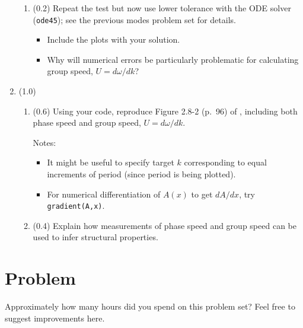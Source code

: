 \documentclass[11pt,titlepage,fleqn]{article}
\begin{document}
\begin{enumerate}
\begin{enumerate}
\item (0.2) Repeat the test but now use lower tolerance with the ODE solver (\verb+ode45+); see the previous modes problem set for details.
%
\begin{itemize}
\item Include the plots with your solution.
\item Why will numerical errors be particularly problematic for calculating group speed, $U = d\omega/dk$?
\end{itemize}

\end{enumerate}


\item (1.0)
%
\begin{enumerate}
\item (0.6) Using your code, reproduce Figure 2.8-2 (p.~96) of \citet{SteinWysession}, including both phase speed and group speed, $U = d\omega/dk$.

Notes:
%
\begin{itemize}
\item It might be useful to specify target $k$ corresponding to equal increments of period (since period is being plotted).
\item For numerical differentiation of $A(x)$ to get $dA/dx$, try \verb+gradient(A,x)+.
\end{itemize}

\item (0.4) Explain how measurements of phase speed and group speed can be used to infer structural properties.
\end{enumerate}


\end{enumerate}


\section*{Problem}

Approximately how many hours did you spend on this problem set? Feel free to suggest improvements here.



\end{document}
